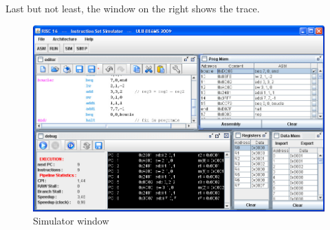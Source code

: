 \documentclass[10pt,a4paper]{article}
\theoremstyle{definition}%
\begin{document}
Last but not least, the window on the right shows the trace.
\begin{figure}[h!]
	\begin{center}
		\includegraphics[width=15cm]{100000000000035F000002289D31421E.jpg}
	\end{center}
\caption{Simulator window}
\label{fig:simulator}
\end{figure}
\end{document}
